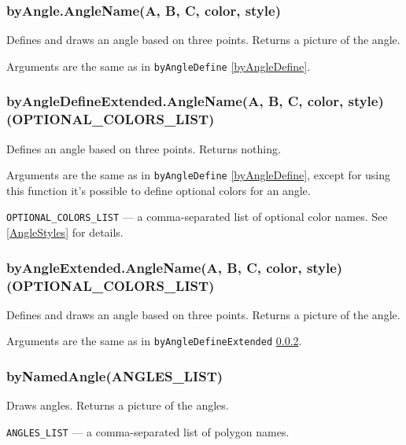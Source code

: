 \documentclass{ltxdoc}
\begin{document}
\subsubsection{byAngle.AngleName(A, B, C, color, style)}\label{byAngle}

	Defines and draws an angle based on three points. Returns a picture of the angle.
	
	Arguments are the same as in \texttt{byAngleDefine} \ref{byAngleDefine}.

\subsubsection{byAngleDefineExtended.AngleName(A, B, C, color, style)(OPTIONAL\_COLORS\_LIST)}\label{byAngleDefineExtended}

	Defines an angle based on three points. Returns nothing.
	
	Arguments are the same as in \texttt{byAngleDefine} \ref{byAngleDefine}, except for using this function it's possible to define optional colors for an angle.
	
	\texttt{OPTIONAL\_COLORS\_LIST} — a comma-separated list of optional color names. See \ref{AngleStyles} for details.
	
\subsubsection{byAngleExtended.AngleName(A, B, C, color, style)(OPTIONAL\_COLORS\_LIST)}\label{byAngleExtended}

	Defines and draws an angle based on three points. Returns a picture of the angle.
	
	Arguments are the same as in \texttt{byAngleDefineExtended} \ref{byAngleDefineExtended}.

\subsubsection{byNamedAngle(ANGLES\_LIST)}\label{byNamedAngle}
	
	Draws angles. Returns a picture of the angles.
	
	\texttt{ANGLES\_LIST} — a comma-separated list of polygon names.

\end{document}
